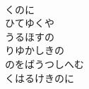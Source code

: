 \documentclass[10pt,b5j]{tarticle} %
\begin{document}
\begin{enumerate}
\begin{minipage}[c]{\blocksize}
    \end{minipage}
    \begin{minipage}[c]{\blocksize}
        
        \vspace{\linespace}
        \item~\\
        くのに\\
        ひてゆくや\\
        うるほすの\\
        りゆかしきの\\
        のをばうつしへむ\\
        くはるけきのに
    
    \end{minipage}
\end{enumerate} %
\end{document}
